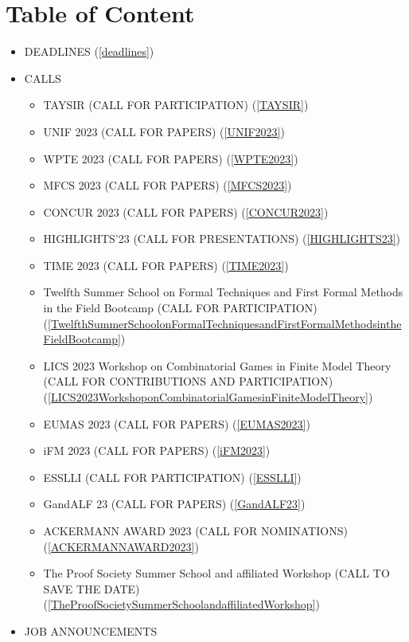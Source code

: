 \documentclass[prodmode,acmtecs]{acmsmall} %
\begin{document}
\section{Table of Content}\begin{itemize}\item DEADLINES (\cref{deadlines}) 
 
\item CALLS 
 
\begin{itemize}\item TAYSIR (CALL FOR PARTICIPATION) (\cref{TAYSIR})
\item UNIF 2023 (CALL FOR PAPERS) (\cref{UNIF2023})
\item WPTE 2023 (CALL FOR PAPERS) (\cref{WPTE2023})
\item MFCS 2023 (CALL FOR PAPERS) (\cref{MFCS2023})
\item CONCUR 2023 (CALL FOR PAPERS) (\cref{CONCUR2023})
\item HIGHLIGHTS’23 (CALL FOR PRESENTATIONS) (\cref{HIGHLIGHTS23})
\item TIME 2023 (CALL FOR PAPERS) (\cref{TIME2023})
\item Twelfth Summer School on Formal Techniques and First Formal Methods in the Field Bootcamp (CALL FOR PARTICIPATION) (\cref{TwelfthSummerSchoolonFormalTechniquesandFirstFormalMethodsintheFieldBootcamp})
\item LICS 2023 Workshop on Combinatorial Games in Finite Model Theory (CALL FOR CONTRIBUTIONS AND PARTICIPATION) (\cref{LICS2023WorkshoponCombinatorialGamesinFiniteModelTheory})
\item EUMAS 2023 (CALL FOR PAPERS) (\cref{EUMAS2023})
\item iFM 2023 (CALL FOR PAPERS) (\cref{iFM2023})
\item ESSLLI (CALL FOR PARTICIPATION) (\cref{ESSLLI})
\item GandALF 23 (CALL FOR PAPERS) (\cref{GandALF23})
\item ACKERMANN AWARD 2023 (CALL FOR NOMINATIONS) (\cref{ACKERMANNAWARD2023})
\item The Proof Society Summer School and affiliated Workshop (CALL TO SAVE THE DATE) (\cref{TheProofSocietySummerSchoolandaffiliatedWorkshop})
\end{itemize} 
\item JOB ANNOUNCEMENTS 
 

\end{itemize}
\end{document}
